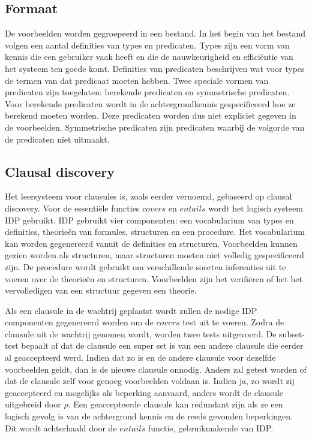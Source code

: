 \subsection{Formaat}
De voorbeelden worden gegroepeerd in een bestand.
In het begin van het bestand volgen een aantal definities van types en predicaten.
Types zijn een vorm van kennis die een gebruiker vaak heeft en die de nauwkeurigheid en effici\"entie van het systeem ten goede komt.
Definities van predicaten beschrijven wat voor types de termen van dat predicaat moeten hebben.
Twee speciale vormen van predicaten zijn toegelaten: berekende predicaten en symmetrische predicaten.
Voor berekende predicaten wordt in de achtergrondkennis gespecificeerd hoe ze berekend moeten worden.
Deze predicaten worden dus niet expliciet gegeven in de voorbeelden.
Symmetrische predicaten zijn predicaten waarbij de volgorde van de predicaten niet uitmaakt.

\subsection{Clausal discovery}
Het leersysteem voor clausules is, zoals eerder vernoemd, gebaseerd op clausal discovery.
Voor de essenti\"ele functies $\mathit{covers}$ en $\mathit{entails}$ wordt het logisch systeem IDP gebruikt.
IDP gebruikt vier componenten: een vocabularium van types en definities, theorie\"en van formules, structuren en een procedure.
Het vocabularium kan worden gegenereerd vanuit de definities en structuren.
Voorbeelden kunnen gezien worden als structuren, maar structuren moeten niet volledig gespecificeerd zijn.
De procedure wordt gebruikt om verschillende soorten inferenties uit te voeren over de theorie\"en en structuren.
Voorbeelden zijn het verifi\"eren of het het vervolledigen van een structuur gegeven een theorie.

Als een clausule in de wachtrij geplaatst wordt zullen de nodige IDP componenten gegenereerd worden om de $\mathit{covers}$ test uit te voeren.
Zodra de clausule uit de wachtrij genomen wordt, worden twee tests uitgevoerd.
De subset-test bepaalt of dat de clausule een super set is van een andere clausule die eerder al geaccepteerd werd.
Indien dat zo is en de andere clausule voor dezelfde voorbeelden geldt, dan is de nieuwe clausule onnodig.
Anders zal getest worden of dat de clausule zelf voor genoeg voorbeelden voldaan is.
Indien ja, zo wordt zij geaccepteerd en mogelijks als beperking aanvaard, anders wordt de clausule uitgebreid door $\rho$.
Een geaccepteerde clausule kan redundant zijn als ze een logisch gevolg is van de achtergrond kennis en de reeds gevonden beperkingen.
Dit wordt achterhaald door de $\mathit{entails}$ functie, gebruikmakende van IDP.

